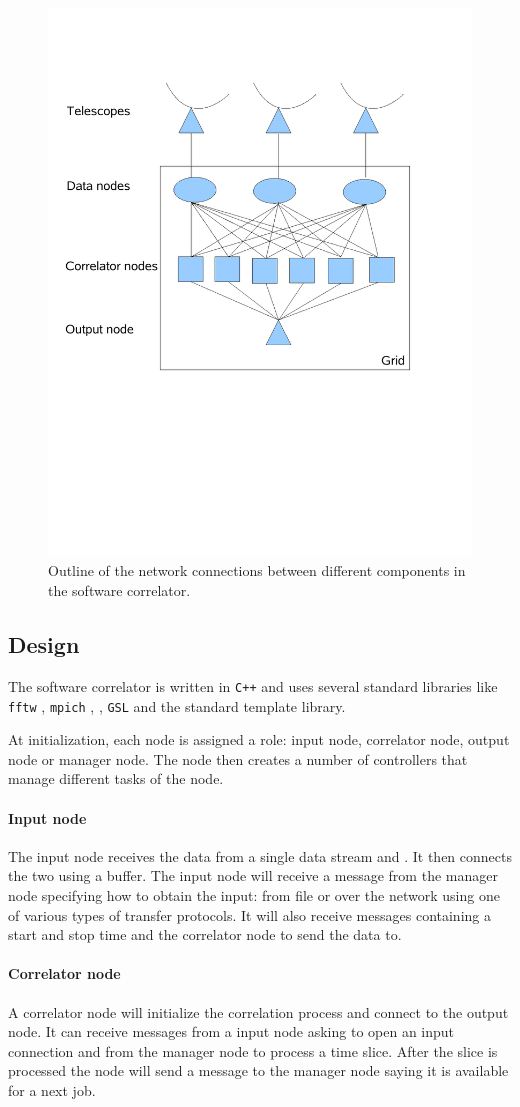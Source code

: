\begin{figure}
  \centering
  \includegraphics[width=.45\textwidth]
    {img/NetworkConnections}
    \caption{Outline of the network connections between different
      components in the software correlator.}
  \label{fig:netw_corr}
\end{figure}


\subsection{Design}
The software correlator is written in \verb~C++~ and uses several
standard libraries like \verb~fftw~ \cite{FFTW05}, \verb~mpich~
\cite{Gropp:1996:HPI}, , \verb~GSL~ \cite{GSL} and the
standard template library.

At initialization, each node is assigned a role: input node, correlator
node, output node or manager node. The node then creates a number of
controllers that manage different tasks of the node. 

\paragraph{Input node}
The input node receives the data from a single data stream and
. It then connects the two using a buffer.
The input node will receive a message from the manager node specifying
how to obtain the input: from file or over the network using one of
various types of transfer protocols. It will also receive messages
containing a start and stop time and the correlator node to send the
data to.

\paragraph{Correlator node}
A correlator node will initialize the correlation process and connect
to the output node. It can receive messages from a input node asking to
open an input connection and from the manager node to process a
time slice. After the slice is processed the node will send a message
to the manager node saying it is available for a next job.

